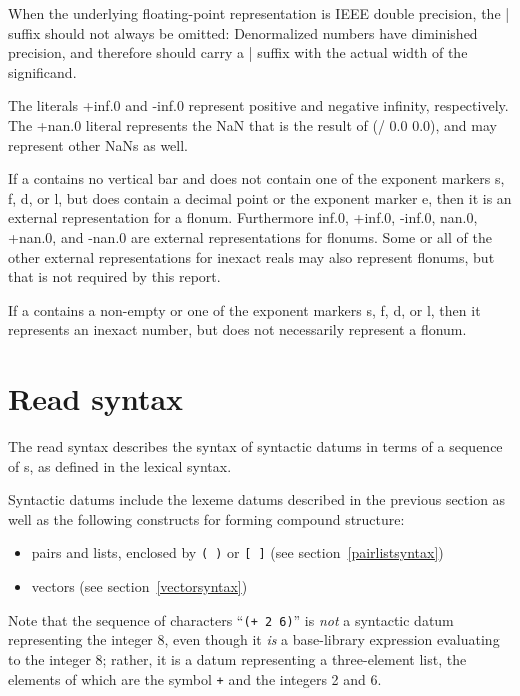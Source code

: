 \begin{note}
When the underlying floating-point representation is IEEE double
precision, the {\cf |} suffix should not always be omitted:
Denormalized numbers have diminished precision, and therefore should
carry a {\cf |} suffix with the actual width of the
significand.
\end{note}

The literals {\cf +inf.0} and {\cf -inf.0} represent positive and
negative infinity, respectively.  The {\cf +nan.0}
literal represents the NaN that is the result of {\cf (/ 0.0 0.0)},
and may represent other NaNs as well.

If a  contains no vertical bar
and does not contain one of the exponent markers {\cf s},
{\cf f}, {\cf d}, or {\cf l}, but does contain a decimal point or the
exponent marker {\cf e}, then it is an external representation for a
flonum.  Furthermore {\cf inf.0}, {\cf +inf.0}, {\cf -inf.0}, {\cf
  nan.0}, {\cf +nan.0}, and {\cf -nan.0} are external representations
for flonums.  Some or all of the other external representations for
inexact reals may also represent flonums, but that is not required by
this report.

If a  contains a non-empty  or
one of the exponent markers {\cf s}, {\cf f}, {\cf d}, or {\cf l},
then it represents an inexact number, but does not necessarily
represent a flonum.

\section{Read syntax}
\label{readsyntaxsection}

The read syntax describes the syntax of
syntactic datums in terms of a sequence of
s, as defined in the lexical syntax.

Syntactic datums include the lexeme datums described in the
previous section as well as the following constructs for forming
compound structure:
%
\begin{itemize}
\item pairs and lists, enclosed by \verb|( )| or \verb|[ ]| (see
  section~\ref{pairlistsyntax})
\item  vectors (see section~\ref{vectorsyntax})
\end{itemize}

Note that the sequence of characters ``{\tt(+ 2 6)}'' is {\em not} a
syntactic datum representing the integer 8, even though it {\em is} a
base-library expression evaluating to the integer 8; rather, it is a
datum representing a three-element list, the elements of which
are the symbol {\tt +} and the integers 2 and 6.

